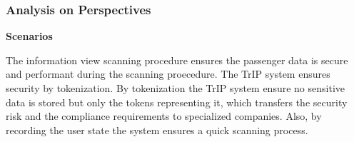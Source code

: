 \subsubsection{Analysis on Perspectives}
\textbf{Scenarios}
\scenarioFourInformation


\noindent The information view scanning procedure ensures the passenger data is secure and performant during the scanning proecedure. The TrIP system ensures security by tokenization. By tokenization the TrIP system ensure no sensitive data is stored but only the tokens representing it, which transfers the security risk and the compliance requirements to specialized companies. Also, by recording the user state the system ensures a quick scanning process.
